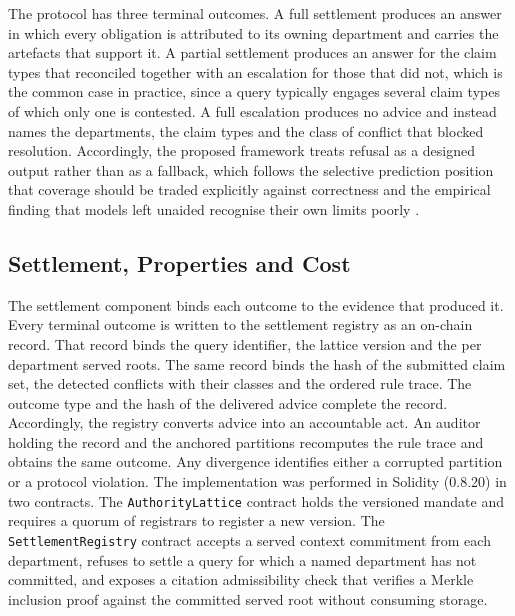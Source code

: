 \documentclass[journal]{IEEEtran}
\begin{document}
The protocol has three terminal outcomes. A full settlement produces an answer in which every obligation is attributed to its owning department and carries the artefacts that support it. A partial settlement produces an answer for the claim types that reconciled together with an escalation for those that did not, which is the common case in practice, since a query typically engages several claim types of which only one is contested. A full escalation produces no advice and instead names the departments, the claim types and the class of conflict that blocked resolution. Accordingly, the proposed framework treats refusal as a designed output rather than as a fallback, which follows the selective prediction position that coverage should be traded explicitly against correctness \cite{kamath2020selective} and the empirical finding that models left unaided recognise their own limits poorly \cite{yin2023knowunknown}.

\subsection{Settlement, Properties and Cost}

The settlement component binds each outcome to the evidence that produced it. Every terminal outcome is written to the settlement registry as an on-chain record. That record binds the query identifier, the lattice version and the per department served roots. The same record binds the hash of the submitted claim set, the detected conflicts with their classes and the ordered rule trace. The outcome type and the hash of the delivered advice complete the record. Accordingly, the registry converts advice into an accountable act. An auditor holding the record and the anchored partitions recomputes the rule trace and obtains the same outcome. Any divergence identifies either a corrupted partition or a protocol violation. The implementation was performed in Solidity (0.8.20) in two contracts. The \texttt{AuthorityLattice} contract holds the versioned mandate and requires a quorum of registrars to register a new version. The \texttt{SettlementRegistry} contract accepts a served context commitment from each department, refuses to settle a query for which a named department has not committed, and exposes a citation admissibility check that verifies a Merkle inclusion proof against the committed served root without consuming storage.
\end{document}
